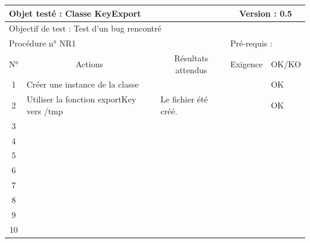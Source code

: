 \documentclass{../res/univ-projet}
\begin{document}
\begin{center}
    \begin{tabular}{|c|p{5cm}|p{5cm}|p{1.5cm}|p{1.5cm}|}
      \hline
      \multicolumn{3}{|l|}{Objet testé : Classe KeyExport} & \multicolumn{2}{c|}{Version : 0.5}\\ \hline
      \multicolumn{5}{|l|}{Objectif de test : Test d'un bug rencontré}\\ \hline
      \multicolumn{3}{|l|}{Procédure n° NR1} & \multicolumn{2}{p{3cm}|}{Pré-requis : }\\ \hline
      \multicolumn{1}{|c|}{N°} & \multicolumn{1}{c|}{Actions} & \multicolumn{1}{c|}{Résultats attendus} & 
      \multicolumn{1}{c|}{Exigence} & \multicolumn{1}{c|}{OK/KO}\\ \hline
      1 & Créer une instance de la classe &  &  & OK \\
      2 & Utiliser la fonction exportKey vers /tmp & Le fichier été créé. &  & OK \\
      3 &  &  &  & \\
      4 &  &  &  & \\
      5 &  &  &  & \\
	    6 &  &  &  & \\
      7 &  &  &  & \\
      8 &  &  &  & \\
      9 &  &  &  & \\
      10 &  &  &  &\\ 
	\hline
    \end{tabular}
    \vskip 2.2cm


\end{center}
\end{document}
